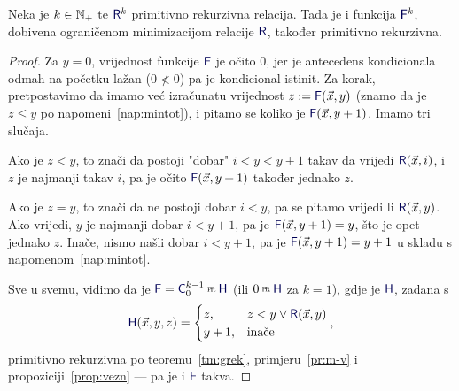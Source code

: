 \begin{propozicija}[{name=[ograničena minimizacija čuva primitivnu rekurzivnost]}]\label{prop:ominprn}
Neka je $k\in{\mathbb N}_+$ te $\f R^k$ primitivno rekurzivna relacija. Tada je i funkcija $\f F^k$\!, dobivena ograničenom minimizacijom relacije $\f R$, također primitivno rekurzivna.
\end{propozicija}
\begin{proof}
	Za $y=0$, vrijednost funkcije $\f F$ je očito $0$, jer je antecedens kondicionala odmah na početku lažan ($0\not<0$) pa je kondicional istinit. Za korak, pretpostavimo da imamo već izračunatu vrijednost $z:=\f F(\vec x,y)$ (znamo da je $z\le y$ po napomeni~\ref{nap:mintot}), i pitamo se koliko je $\f F(\vec x,y+1)$. Imamo tri slučaja.

	Ako je $z<y$, to znači da postoji "dobar" $i<y<y+1$ takav da vrijedi $\f R(\vec x,i)$, i $z$ je najmanji takav $i$, pa je očito $\f F(\vec x,y+1)$ također jednako $z$.

	Ako je $z=y$, to znači da ne postoji dobar $i<y$, pa se pitamo vrijedi li $\f R(\vec x,y)$. Ako vrijedi, $y$ je najmanji dobar $i<y+1$, pa je $\f F(\vec x,y+1)=y$, što je opet jednako $z$.
	Inače, nismo našli dobar $i<y+1$, pa je $\f F(\vec x,y+1)=y+1$ u skladu s napomenom~\ref{nap:mintot}.

	Sve u svemu, vidimo da je $\f F=\f C_0^{k-1}\pr\f H$ (ili $0\pr\f H$ za $k=1$), gdje je $\f H$, zadana s
\begin{equation}
	\f H(\vec x,y,z)=\begin{cases}
		z,&z<y\vee\f R(\vec x,y)\\
		y+1,&\text{inače}
	\end{cases}\text,
\end{equation}
	primitivno rekurzivna po teoremu~\ref{tm:grek}, primjeru~\ref{pr:m-v} i propoziciji~\ref{prop:vezn} --- pa je i $\f F$ takva.
\end{proof}
